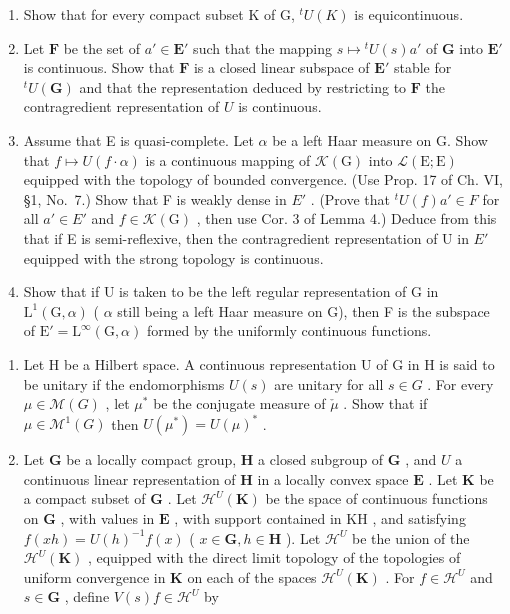 \begin{enumerate}
\def\labelenumi{\alph{enumi})}
\item
  Show that for every compact subset K of G, \({}^{t}U(K)\) is equicontinuous.
\item
  Let \(\mathbf{F}\) be the set of \(a' \in \mathbf{E}'\) such that the mapping \(s \mapsto {}^t U(s)a'\) of \(\mathbf{G}\) into \(\mathbf{E}'\) is continuous. Show that \(\mathbf{F}\) is a closed linear subspace of \(\mathbf{E}'\) stable for \({}^t U(\mathbf{G})\) and that the representation deduced by restricting to \(\mathbf{F}\) the contragredient representation of \(U\) is continuous.
\item
  Assume that E is quasi-complete. Let \(\alpha\) be a left Haar measure on G. Show that \(f \mapsto U(f \cdot \alpha)\) is a continuous mapping of \(\mathcal{K}(\mathrm{G})\) into \(\mathcal{L}(\mathrm{E};\mathrm{E})\) equipped with the topology of bounded convergence. (Use Prop. 17 of Ch. VI, §1, No.~7.) Show that F is weakly dense in \(E'\) . (Prove that \({}^{t}U(f)a' \in F\) for all \(a' \in E'\) and \(f \in \mathcal{K}(\mathrm{G})\) , then use Cor. 3 of Lemma 4.) Deduce from this that if E is semi-reflexive, then the contragredient representation of U in \(E'\) equipped with the strong topology is continuous.
\item
  Show that if U is taken to be the left regular representation of G in \(\mathrm{L}^{1}(\mathrm{G},\alpha)\) ( \(\alpha\) still being a left Haar measure on G), then F is the subspace of \(\mathrm{E}' = \mathrm{L}^{\infty}(\mathrm{G},\alpha)\) formed by the uniformly continuous functions.
\end{enumerate}

\begin{enumerate}
\def\labelenumi{\arabic{enumi})}
\setcounter{enumi}{3}
\item
  Let H be a Hilbert space. A continuous representation U of G in H is said to be unitary if the endomorphisms \(U(s)\) are unitary for all \(s \in G\) . For every \(\mu \in \mathcal{M}(G)\) , let \(\mu^{*}\) be the conjugate measure of \(\check{\mu}\) . Show that if \(\mu \in \mathcal{M}^{1}(G)\) then \(U(\mu^{*}) = U(\mu)^{*}\) .
\item
  Let \(\mathbf{G}\) be a locally compact group, \(\mathbf{H}\) a closed subgroup of \(\mathbf{G}\) , and \(U\) a continuous linear representation of \(\mathbf{H}\) in a locally convex space \(\mathbf{E}\) . Let \(\mathbf{K}\) be a compact subset of \(\mathbf{G}\) . Let \(\mathcal{H}^U(\mathbf{K})\) be the space of continuous functions on \(\mathbf{G}\) , with values in \(\mathbf{E}\) , with support contained in \(\mathrm{KH}\) , and satisfying \(f(xh) = U(h)^{-1}f(x)\) ( \(x \in \mathbf{G}, h \in \mathbf{H}\) ). Let \(\mathcal{H}^U\) be the union of the \(\mathcal{H}^U(\mathbf{K})\) , equipped with the direct limit topology of the topologies of uniform convergence in \(\mathbf{K}\) on each of the spaces \(\mathcal{H}^U(\mathbf{K})\) . For \(f \in \mathcal{H}^U\) and \(s \in \mathbf{G}\) , define \(V(s)f \in \mathcal{H}^U\) by
\end{enumerate}

